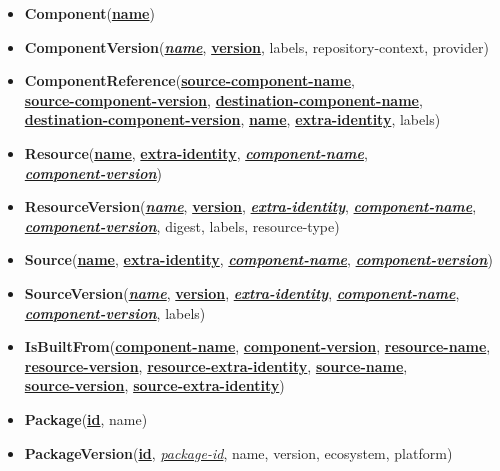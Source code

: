\begin{itemize}
	\item \textbf{Component}(\textbf{\underline{name}})
	\item \textbf{ComponentVersion}(\textbf{\underline{\textit{name}}}, \textbf{\underline{version}}, labels, repository-context, provider)
	\item \textbf{ComponentReference}(\textbf{\underline{source-component-name}},\\ \textbf{\underline{source-component-version}}, \textbf{\underline{destination-component-name}},\\ \textbf{\underline{destination-component-version}}, \textbf{\underline{name}}, \textbf{\underline{extra-identity}}, labels)
	\item \textbf{Resource}(\textbf{\underline{name}}, \textbf{\underline{extra-identity}}, \textbf{\underline{\textit{component-name}}},\\ \textbf{\underline{\textit{component-version}}})
	\item \textbf{ResourceVersion}(\textbf{\underline{\textit{name}}}, \textbf{\underline{version}}, \textbf{\underline{\textit{extra-identity}}}, \textbf{\underline{\textit{component-name}}},\\ \textbf{\underline{\textit{component-version}}}, digest, labels, resource-type)
	\item \textbf{Source}(\textbf{\underline{name}}, \textbf{\underline{extra-identity}}, \textbf{\underline{\textit{component-name}}}, \textbf{\underline{\textit{component-version}}})
	\item \textbf{SourceVersion}(\textbf{\underline{\textit{name}}}, \textbf{\underline{version}}, \textbf{\underline{\textit{extra-identity}}}, \textbf{\underline{\textit{component-name}}},\\ \textbf{\underline{\textit{component-version}}}, labels)
	\item \textbf{IsBuiltFrom}(\textbf{\underline{component-name}}, \textbf{\underline{component-version}}, \textbf{\underline{resource-name}},\\ \textbf{\underline{resource-version}}, \textbf{\underline{resource-extra-identity}}, \textbf{\underline{source-name}},\\ \textbf{\underline{source-version}}, \textbf{\underline{source-extra-identity}})
	\item \textbf{Package}(\textbf{\underline{id}}, name)
	\item \textbf{PackageVersion}(\textbf{\underline{id}}, \underline{\textit{package-id}}, name, version, ecosystem, platform)

\end{itemize}
